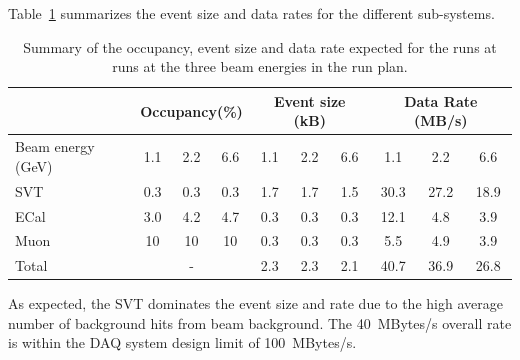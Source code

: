 Table~\ref{tab:data_rates} summarizes the event size and data rates for the different sub-systems. 
\begin{table}[]
\centering
\begin{tabular}{|l|ccc|ccc|ccc|}
\hline
 & \multicolumn{3}{|c|}{Occupancy(\%)} &  \multicolumn{3}{|c|}{Event size (kB)} &  \multicolumn{3}{|c|}{Data Rate (MB/s)} \\
\hline
Beam energy (GeV) & 1.1 & 2.2 & 6.6 & 1.1 & 2.2 & 6.6 & 1.1 & 2.2 & 6.6 \\
\hline
SVT & 0.3 & 0.3  & 0.3  & 1.7 & 1.7 & 1.5 & 30.3 & 27.2 & 18.9\\
ECal & 3.0 & 4.2  & 4.7 & 0.3 & 0.3  & 0.3 & 12.1 & 4.8  & 3.9 \\
Muon & 10 &  10 & 10  & 0.3 & 0.3 & 0.3 & 5.5 & 4.9 & 3.9 \\
\hline
Total& \multicolumn{3}{|c|}{-} & 2.3 & 2.3 & 2.1 & 40.7 & 36.9 & 26.8 \\
\hline
\end{tabular}
\caption{{\small Summary of the occupancy, event size and data rate expected for the runs at  runs at the three beam 
energies in the run plan. }}
\label{tab:data_rates}
\end{table}
As expected, the SVT dominates the event size and rate due to the high average number of background 
hits from beam background. The 40~MBytes/s overall rate is within the DAQ system design limit of 100~MBytes/s. 
